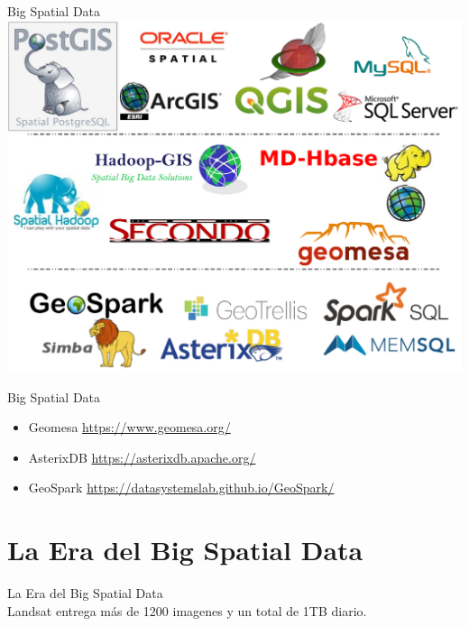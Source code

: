\documentclass{beamer}
\begin{document}
\begin{frame}[noframenumbering]{Big Spatial Data}
  \centering
  \includegraphics[clip, trim=0cm 0cm 0cm 0cm, width=0.85\linewidth]{figures/logos}
\end{frame}

\begin{frame}{Big Spatial Data}
    \begin{itemize}
        \item Geomesa \url{https://www.geomesa.org/}
        \item AsterixDB \url{https://asterixdb.apache.org/}
        \item GeoSpark \url{https://datasystemslab.github.io/GeoSpark/}
    \end{itemize}
\end{frame}

\section{La Era del Big Spatial Data}

\begin{frame}{La Era del Big Spatial Data}
    \centering
    \\
    
    Landsat entrega más de 1200 imagenes y un total de 1TB diario.
\end{frame}
\end{document}
